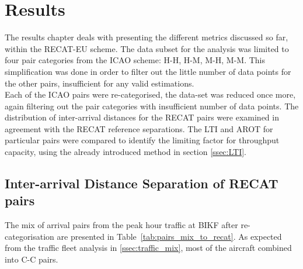 \chapter{Results\label{cha:results}}


The results chapter deals with presenting the different metrics discussed so far, within the RECAT-EU scheme. The data subset for the analysis was limited to four pair categories from the ICAO scheme: H-H, H-M, M-H, M-M. This simplification was done in order to filter out the little number of data points for the other pairs, insufficient for any valid estimations. \\
Each of the ICAO pairs were re-categorised, the data-set was reduced once more, again filtering out the pair categories with insufficient number of data points. 
The distribution of inter-arrival distances for the RECAT pairs were examined in agreement with the RECAT reference separations. The LTI and AROT for particular pairs were compared to identify the limiting factor for throughput capacity, using the already introduced method in section \ref{ssec:LTI}.

\section{Inter-arrival Distance Separation of RECAT pairs}\label{sec:interarrival_dist_sep_RECAT}
The mix of arrival pairs from the peak hour traffic at BIKF after re-categorisation are presented in Table~\ref{tab:pairs_mix_to_recat}. As expected from the traffic fleet analysis in \ref{ssec:traffic_mix}, most of the aircraft combined into C-C pairs. 

